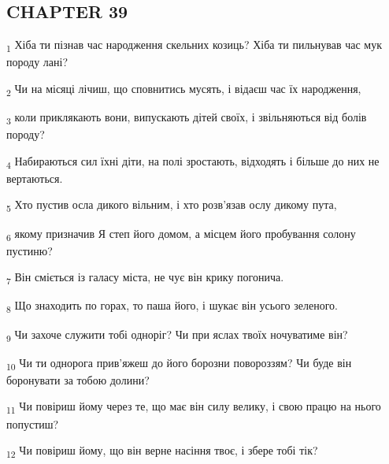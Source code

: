 \subsection{CHAPTER 39}
\begin{tcolorbox}
\textsubscript{1} Хіба ти пізнав час народження скельних козиць? Хіба ти пильнував час мук породу лані?
\end{tcolorbox}
\begin{tcolorbox}
\textsubscript{2} Чи на місяці лічиш, що сповнитись мусять, і відаєш час їх народження,
\end{tcolorbox}
\begin{tcolorbox}
\textsubscript{3} коли приклякають вони, випускають дітей своїх, і звільняються від болів породу?
\end{tcolorbox}
\begin{tcolorbox}
\textsubscript{4} Набираються сил їхні діти, на полі зростають, відходять і більше до них не вертаються.
\end{tcolorbox}
\begin{tcolorbox}
\textsubscript{5} Хто пустив осла дикого вільним, і хто розв'язав ослу дикому пута,
\end{tcolorbox}
\begin{tcolorbox}
\textsubscript{6} якому призначив Я степ його домом, а місцем його пробування солону пустиню?
\end{tcolorbox}
\begin{tcolorbox}
\textsubscript{7} Він сміється із галасу міста, не чує він крику погонича.
\end{tcolorbox}
\begin{tcolorbox}
\textsubscript{8} Що знаходить по горах, то паша його, і шукає він усього зеленого.
\end{tcolorbox}
\begin{tcolorbox}
\textsubscript{9} Чи захоче служити тобі одноріг? Чи при яслах твоїх ночуватиме він?
\end{tcolorbox}
\begin{tcolorbox}
\textsubscript{10} Чи ти однорога прив'яжеш до його борозни повороззям? Чи буде він боронувати за тобою долини?
\end{tcolorbox}
\begin{tcolorbox}
\textsubscript{11} Чи повіриш йому через те, що має він силу велику, і свою працю на нього попустиш?
\end{tcolorbox}
\begin{tcolorbox}
\textsubscript{12} Чи повіриш йому, що він верне насіння твоє, і збере тобі тік?
\end{tcolorbox}
